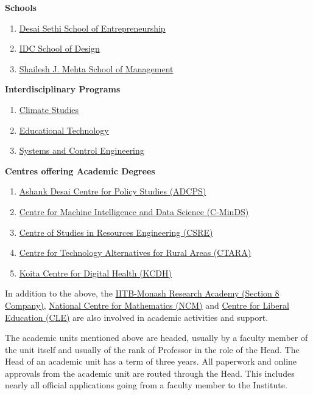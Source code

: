 \documentclass[
  10pt,
  a5paper,
  10pt,
  openany]{amsbook}
\providecommand{\tightlist}{%
  \setlength{\itemsep}{0pt}\setlength{\parskip}{0pt}}
\begin{document}
\textbf{Schools}

\begin{enumerate}
\def\labelenumi{\arabic{enumi}.}
\tightlist
\item
  \href{https://www.dsse.iitb.ac.in/}{Desai Sethi School of
  Entrepreneurship}
\item
  \href{http://www.idc.iitb.ac.in/}{IDC School of Design}
\item
  \href{http://www.som.iitb.ac.in/}{Shailesh J. Mehta School of
  Management}
\end{enumerate}

\textbf{Interdisciplinary Programs}

\begin{enumerate}
\def\labelenumi{\arabic{enumi}.}
\tightlist
\item
  \href{http://www.climate.iitb.ac.in/}{Climate Studies}
\item
  \href{http://www.et.iitb.ac.in/}{Educational Technology}
\item
  \href{http://www.sc.iitb.ac.in/}{Systems and Control Engineering}
\end{enumerate}

\textbf{Centres offering Academic Degrees}

\begin{enumerate}
\def\labelenumi{\arabic{enumi}.}
\tightlist
\item
  \href{http://www.cps.iitb.ac.in/}{Ashank Desai Centre for Policy
  Studies (ADCPS)}
\item
  \href{https://www.minds.iitb.ac.in/}{Centre for Machine Intelligence
  and Data Science (C-MinDS)}
\item
  \href{http://www.csre.iitb.ac.in/}{Centre of Studies in Resources
  Engineering (CSRE)}
\item
  \href{http://www.ctara.iitb.ac.in/}{Centre for Technology Alternatives
  for Rural Areas (CTARA)}
\item
  \href{https://www.kcdh.iitb.ac.in/}{Koita Centre for Digital Health
  (KCDH)}
\end{enumerate}

In addition to the above, the
\href{http://www.iitbmonash.org/}{IITB-Monash Research Academy (Section
8 Company)}, \href{http://www.ncmath.org/}{National Centre for
Mathematics (NCM)} and \href{https://cle.iitb.ac.in/}{Centre for Liberal
Education (CLE)} are also involved in academic activities and support.

The academic units mentioned above are headed, usually by a faculty
member of the unit itself and usually of the rank of Professor in the
role of the Head. The Head of an academic unit has a term of three
years. All paperwork and online approvals from the academic unit are
routed through the Head. This includes nearly all official applications
going from a faculty member to the Institute.
\end{document}

